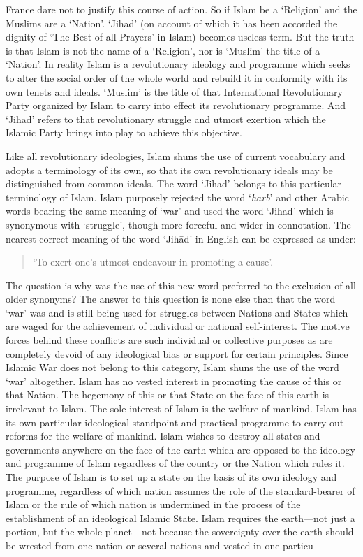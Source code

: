France dare not to justify this course of action.
So if Islam be a `Religion' and the Muslims are a `Nation'. `Jihad' (on
account of which it has been accorded the dignity of `The Best of all
Prayers' in Islam) becomes useless term. But the truth is that Islam is
not the name of a `Religion', nor is `Muslim' the title of a `Nation'.
In reality Islam is a revolutionary ideology and programme which seeks
to alter the social order of the whole world and rebuild it in
conformity with its own tenets and ideals. `Muslim' is the title of that
International Revolutionary Party organized by Islam to carry into
effect its revolutionary programme. And `Jihād' refers to that
revolutionary struggle and utmost exertion which the Islamic Party
brings into play to achieve this objective.

Like all revolutionary ideologies, Islam shuns the use of current
vocabulary and adopts a terminology of its own, so that its own
revolutionary ideals may be distinguished from common ideals. The word
`Jihad' belongs to this particular terminology of Islam. Islam purposely
rejected the word `\emph{harb}' and other Arabic words bearing the same
meaning of `war' and used the word `Jihad' which is synonymous with
`struggle', though more forceful and wider in connotation. The nearest
correct meaning of the word `Jihād' in English can be expressed as
under:

\begin{quote}
`To exert one's utmost endeavour in promoting a cause'.
\end{quote}

The question is why was the use of this new word preferred to the
exclusion of all older synonyms? The answer to this question is none
else than that the word `war' was and is still being used for struggles
between Nations and States which are waged for the achievement of
individual or national self-interest. The motive forces behind these
conflicts are such individual or collective purposes as are completely
devoid of any ideological bias or support for certain principles. Since
Islamic War does not belong to this category, Islam shuns the use of the
word `war' altogether. Islam has no vested interest in promoting the
cause of this or that Nation. The hegemony of this or that State on the
face of this earth is irrelevant to Islam. The sole interest of Islam is
the welfare of mankind. Islam has its own particular ideological
standpoint and practical programme to carry out reforms for the welfare
of mankind. Islam wishes to destroy all states and governments anywhere
on the face of the earth which are opposed to the ideology and programme
of Islam regardless of the country or the Nation which rules it. The
purpose of Islam is to set up a state on the basis of its own ideology
and programme, regardless of which nation assumes the role of the
standard-bearer of Islam or the rule of which nation is undermined in
the process of the establishment of an ideological Islamic State. Islam
requires the earth---not just a portion, but the whole planet---not
because the sovereignty over the earth should be wrested from one nation
or several nations and vested in one particu-

